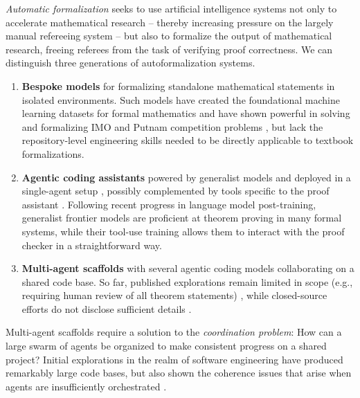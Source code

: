 \documentclass[]{fairmeta}
\begin{document}
\emph{Automatic formalization} seeks to use artificial intelligence systems not only to accelerate mathematical research -- thereby increasing pressure on the largely manual refereeing system -- but also to formalize the output of mathematical research, freeing referees from the task of verifying proof correctness.
We can distinguish three generations of autoformalization systems.
\begin{enumerate}
\item \textbf{Bespoke models} for formalizing standalone mathematical statements in isolated environments. Such models have created the foundational machine learning datasets for formal mathematics \citep{xin2024deepseek,ying2024lean,dong2025stpselfplayllmtheorem} and have shown powerful in solving and formalizing IMO and Putnam competition problems \citep{lin2025goedel,chen2025seedprover15masteringundergraduatelevel,ren2025deepseekproverv2advancingformalmathematical,hubert2025olympiad,achim2025aristotleimolevelautomatedtheorem},
but lack the repository-level engineering skills needed to be directly applicable to textbook formalizations. 
\item \textbf{Agentic coding assistants} \citep{schick2023toolformer,yang2024sweagentagentcomputerinterfacesenable} powered by generalist models and deployed in a single-agent setup \citep{urban2026130klinesformaltopology}, possibly complemented by tools specific to the proof assistant \citep{liu2026numina}. Following recent progress in language model post-training, generalist frontier models are proficient at theorem proving in many formal systems, while their tool-use training allows them to interact with the proof checker in a straightforward way.
\item \textbf{Multi-agent scaffolds}
with several agentic coding models collaborating on a shared code base. So far, published explorations remain limited in scope (e.g., requiring human review of all theorem statements) \citep{wang2026m2fautomatedformalizationmathematical}, while closed-source efforts do not disclose sufficient details \citep{skuse2026watershed,chen2026felsconjecturesyzygiesnumerical}.
\end{enumerate}

Multi-agent scaffolds require a solution to the \emph{coordination problem}: How can a large swarm of agents be organized to make consistent progress on a shared project? Initial explorations in the realm of software engineering have produced remarkably large code bases, but also shown the coherence issues that arise when agents are insufficiently orchestrated \citep{Lin2026ScalingAgents,Carlini2026BuildingCCompiler}.
\end{document}
